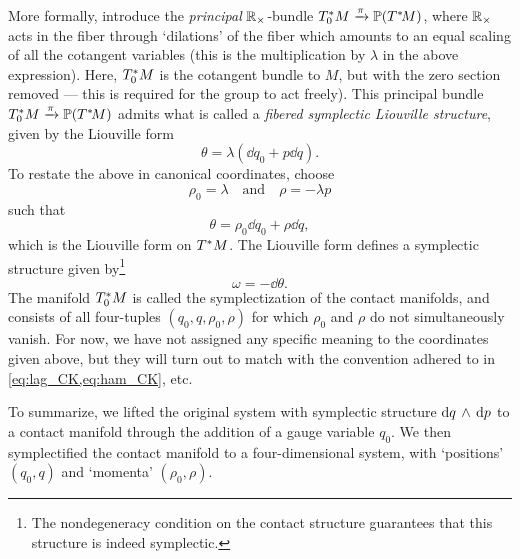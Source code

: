 More formally, introduce the \emph{principal} $\mathbb{R}_{\times}$-bundle $T^*_0M\xrightarrow[]{\pi}\mathbb{P}\qty(T^*\!M)$, where $\mathbb{R}_{\times}$ acts in the fiber through `dilations' of the fiber which amounts to an equal scaling of all the cotangent variables (this is the multiplication by $\lambda$ in the above expression). Here, $T^*_0M$ is the cotangent bundle to $M$, but with the zero section removed --- this is required for the group to act freely). This principal bundle $T^*_0M\xrightarrow[]{\pi}\mathbb{P}\qty(T^*\!M)$ admits what is called a \emph{fibered symplectic Liouville structure}, given by the Liouville form \cite{Libermann1987}
$$ \theta = \lambda ( \dd{q_0} + p \dd{q} ). $$
To restate the above in canonical coordinates, choose
\begin{equation}
    \rho_0 = \lambda \quad \text{and} \quad \rho = -\lambda p
    \label{eq:homo_coords}
\end{equation}
such that
\begin{equation} 
    \theta = \rho_0\dd{q}_0 + \rho\dd{q}, 
    \label{eq:dho_liouville_form}
\end{equation}
which is the Liouville form on $T^*M$. \cite[p. 308]{Libermann1987}  The Liouville form defines a symplectic structure given by\footnote
{The nondegeneracy condition on the contact structure guarantees that this structure is indeed symplectic.}
$$\omega = -\dd{\theta}.$$ The manifold $T^*_0M$ is called the symplectization of the contact manifolds, and consists of all four-tuples $(q_0, q, \rho_0, \rho)$ for which $\rho_0$ and $\rho$ do not simultaneously vanish. For now, we have not assigned any specific meaning to the coordinates given above, but they will turn out to match with the convention adhered to in \cref{eq:lag_CK,eq:ham_CK}, etc.

To summarize, we lifted the original system with symplectic structure $ \dd{q}\,\wedge\,\dd{p} $ to a contact manifold through the addition of a gauge variable $q_0$. We then symplectified the contact manifold to a four-dimensional system, with `positions' $(q_0, q)$ and `momenta' $(\rho_0, \rho)$.

